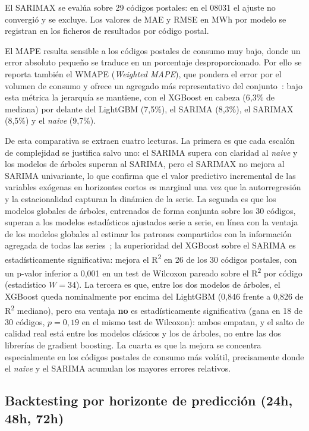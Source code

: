 \documentclass[12pt, a4paper]{article}
\begin{document}
{\footnotesize\raggedright El SARIMAX se evalúa sobre 29 códigos postales: en el 08031 el ajuste no convergió y se excluye. Los valores de MAE y RMSE en MWh por modelo se registran en los ficheros de resultados por código postal.\par}


El MAPE resulta sensible a los códigos postales de consumo muy bajo, donde un error absoluto pequeño se traduce en un porcentaje desproporcionado. Por ello se reporta también el WMAPE (\textit{Weighted MAPE}), que pondera el error por el volumen de consumo y ofrece un agregado más representativo del conjunto~\cite{hyndman2021}: bajo esta métrica la jerarquía se mantiene, con el XGBoost en cabeza (6,3\% de mediana) por delante del LightGBM (7,5\%), el SARIMA (8,3\%), el SARIMAX (8,5\%) y el \textit{naive} (9,7\%).

De esta comparativa se extraen cuatro lecturas. La primera es que cada escalón de complejidad se justifica salvo uno: el SARIMA supera con claridad al \textit{naive} y los modelos de árboles superan al SARIMA, pero el SARIMAX no mejora al SARIMA univariante, lo que confirma que el valor predictivo incremental de las variables exógenas en horizontes cortos es marginal una vez que la autorregresión y la estacionalidad capturan la dinámica de la serie. La segunda es que los modelos globales de árboles, entrenados de forma conjunta sobre los 30 códigos, superan a los modelos estadísticos ajustados serie a serie, en línea con la ventaja de los modelos globales al estimar los patrones compartidos con la información agregada de todas las series~\cite{montero2021}; la superioridad del XGBoost sobre el SARIMA es estadísticamente significativa: mejora el R\textsuperscript{2} en 26 de los 30 códigos postales, con un p-valor inferior a 0,001 en un test de Wilcoxon pareado sobre el R\textsuperscript{2} por código (estadístico $W=34$). La tercera es que, entre los dos modelos de árboles, el XGBoost queda nominalmente por encima del LightGBM (0,846 frente a 0,826 de R\textsuperscript{2} mediano), pero esa ventaja \textbf{no} es estadísticamente significativa (gana en 18 de 30 códigos, $p=0,19$ en el mismo test de Wilcoxon): ambos empatan, y el salto de calidad real está entre los modelos clásicos y los de árboles, no entre las dos librerías de gradient boosting. La cuarta es que la mejora se concentra especialmente en los códigos postales de consumo más volátil, precisamente donde el \textit{naive} y el SARIMA acumulan los mayores errores relativos.

\subsection{Backtesting por horizonte de predicción (24h, 48h, 72h)}
\end{document}
